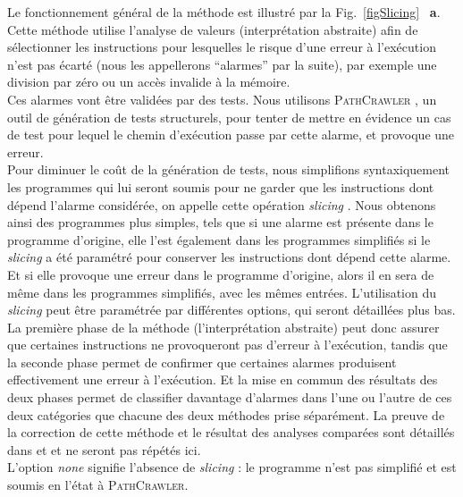 Le fonctionnement général de la méthode est illustré par la
Fig.~\ref{figSlicing} ~\textbf{a}. Cette méthode utilise l'analyse de valeurs
(interprétation abstraite) afin de sélectionner les instructions pour lesquelles
le risque d'une erreur à l'exécution n'est pas écarté (nous les appellerons
``alarmes'' par la suite), par exemple une division par zéro ou un accès
invalide à la mémoire.\\

Ces alarmes vont être validées par des tests. Nous utilisons
\textsc{PathCrawler} \cite{PathCrawler}, un outil de génération de tests
structurels, pour tenter de mettre en évidence un cas de test pour lequel le
chemin d'exécution passe par cette alarme, et provoque une erreur.\\

Pour diminuer le coût de la génération de tests, nous simplifions
syntaxiquement les programmes qui lui seront soumis pour ne garder que les
instructions dont dépend l'alarme considérée, on appelle cette opération
{\em slicing} \cite{slicing}. Nous obtenons ainsi des programmes plus simples,
tels que si une alarme est présente dans le programme d'origine, elle l'est
également dans les programmes simplifiés si le {\em slicing} a été paramétré
pour conserver les instructions dont dépend cette alarme. Et si elle provoque
une erreur dans le programme d'origine, alors il en sera de même dans les
programmes simplifiés, avec les mêmes entrées. L'utilisation du {\em slicing}
peut être paramétrée par différentes options, qui seront détaillées plus bas.\\

La première phase de la méthode (l'interprétation abstraite) peut donc assurer
que certaines instructions ne provoqueront pas d'erreur à l'exécution, tandis
que la seconde phase permet de confirmer que certaines alarmes produisent
effectivement une erreur à l'exécution. Et la mise en commun des résultats des
deux phases permet de classifier davantage d'alarmes dans l'une ou l'autre de
ces deux catégories que chacune des deux méthodes prise séparément. La preuve de
la correction de cette méthode et le résultat des analyses comparées sont
détaillés dans \cite{TheseOmar} et \cite{SANTE} et ne seront pas répétés ici.\\



L'option {\em none} signifie l'absence de {\em slicing} : le programme n'est pas
simplifié et est soumis en l'état à \textsc{PathCrawler}.\\

